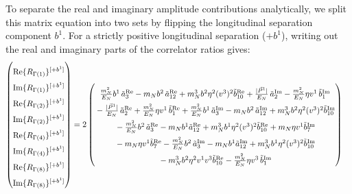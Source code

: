 \endgroup
To separate the real and imaginary amplitude contributions analytically, we split this matrix equation into two sets by flipping the longitudinal separation component $b^1$. For a strictly positive longitudinal separation ($+b^1$), writing out the real and imaginary parts of the correlator ratios gives:
\begin{align}
    \begin{pmatrix}
        \rule{0pt}{16pt} \text{Re}\{ R_{\Gamma(1)}\}^{[+b^1]} \\
        \rule{0pt}{16pt} \text{Im}\{ R_{\Gamma(1)}\}^{[+b^1]} \\
        \rule{0pt}{16pt} \text{Re}\{ R_{\Gamma(2)}\}^{[+b^1]} \\
        \rule{0pt}{16pt} \text{Im}\{ R_{\Gamma(2)}\}^{[+b^1]} \\
        \rule{0pt}{16pt} \text{Re}\{ R_{\Gamma(4)}\}^{[+b^1]} \\
        \rule{0pt}{16pt} \text{Im}\{ R_{\Gamma(4)}\}^{[+b^1]} \\
        \rule{0pt}{16pt} \text{Re}\{ R_{\Gamma(8)}\}^{[+b^1]} \\
        \rule{0pt}{16pt} \text{Im}\{ R_{\Gamma(8)}\}^{[+b^1]}
    \end{pmatrix} &= 2\begin{pmatrix}
     \rule{0pt}{16pt}   \frac{\mN^2}{E_N} \bvec^1\, \tilde a^{\text{Re}}_3-  \mN  \bvec^2 \, \tilde a^{\text{Re}}_{12}+  \mN^3  \bvec^2 \eta^2 (v^3)^2 \tilde b^{\text{Re}}_{10} +\frac{|\vec{P}^1|}{E_N}\, \tilde a^{\text{Im}}_2- \frac{\mN^2}{E_N} \eta v^1\, \tilde b^{\text{Im}}_1\\
      \rule{0pt}{16pt}  -\frac{|\vec{P}^1|}{E_N}\, \tilde a^{\text{Re}}_2+ \frac{\mN^2}{E_N} \eta v^1\, \tilde b^{\text{Re}}_1 + \frac{\mN^2}{E_N} \bvec^1\, \tilde a^{\text{Im}}_3-  \mN  \bvec^2 \, \tilde a^{\text{Im}}_{12}+  \mN^3  \bvec^2 \eta^2 (v^3)^2 \tilde b^{\text{Im}}_{10}\\
      \rule{0pt}{16pt}  -  \frac{\mN^2}{E_N} \bvec^2\, \tilde a^{\text{Re}}_3
		-  \mN   \bvec^1  \tilde a^{\text{Re}}_{12}+ \mN^3  \bvec^1 \eta^2 (v^3)^2 \tilde b^{\text{Re}}_{10}+\mN \eta v^1  \tilde b^{\text{Im}}_7 \\
      \rule{0pt}{16pt} - \mN \eta v^1  \tilde b^{\text{Re}}_7 -  \frac{\mN^2}{E_N} \bvec^2\, \tilde a^{\text{Im}}_3
		-  \mN   \bvec^1  \tilde a^{\text{Im}}_{12}+ \mN^3  \bvec^1 \eta^2 (v^3)^2 \tilde b^{\text{Im}}_{10}\\
      \rule{0pt}{16pt} -\mN^3 \bvec^2 \eta^2 v^1 v^3\tilde b^{\text{Re}}_{10}-\frac{\mN^2}{E_N} \eta v^3\, \tilde b^{\text{Im}}_1\\

\end{pmatrix}
\end{align}
